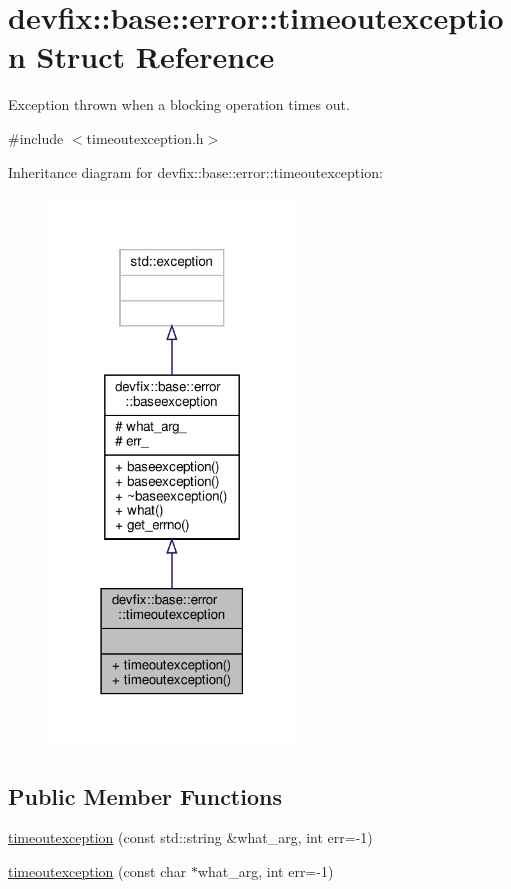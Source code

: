 \hypertarget{structdevfix_1_1base_1_1error_1_1timeoutexception}{}\section{devfix\+:\+:base\+:\+:error\+:\+:timeoutexception Struct Reference}
\label{structdevfix_1_1base_1_1error_1_1timeoutexception}


Exception thrown when a blocking operation times out.  




{\ttfamily \#include $<$timeoutexception.\+h$>$}



Inheritance diagram for devfix\+:\+:base\+:\+:error\+:\+:timeoutexception\+:\nopagebreak
\begin{figure}[H]
\begin{center}
\leavevmode
\includegraphics[width=186pt]{structdevfix_1_1base_1_1error_1_1timeoutexception__inherit__graph}
\end{center}
\end{figure}
\subsection*{Public Member Functions}
\begin{DoxyCompactItemize}
\item 
\hyperlink{structdevfix_1_1base_1_1error_1_1timeoutexception_abb684b432a5367385d8f975898226c8d}{timeoutexception} (const std\+::string \&what\+\_\+arg, int err=-\/1)
\item 
\hyperlink{structdevfix_1_1base_1_1error_1_1timeoutexception_a7096cca05d73ac6da75746d1737e1ec1}{timeoutexception} (const char $\ast$what\+\_\+arg, int err=-\/1)
\end{DoxyCompactItemize}
